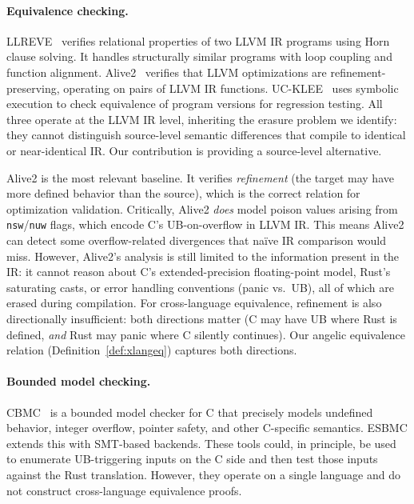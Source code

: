 \documentclass[11pt]{article}
\begin{document}
\paragraph{Equivalence checking.}
LLREVE~\cite{felsing2014} verifies relational properties of two LLVM IR programs using Horn clause solving. It handles structurally similar programs with loop coupling and function alignment. Alive2~\cite{lopes2021alive2} verifies that LLVM optimizations are refinement-preserving, operating on pairs of LLVM IR functions. UC-KLEE~\cite{ramos2015} uses symbolic execution to check equivalence of program versions for regression testing. All three operate at the LLVM IR level, inheriting the erasure problem we identify: they cannot distinguish source-level semantic differences that compile to identical or near-identical IR. Our contribution is providing a source-level alternative.

Alive2 is the most relevant baseline. It verifies \emph{refinement} (the target may have more defined behavior than the source), which is the correct relation for optimization validation. Critically, Alive2 \emph{does} model poison values arising from \texttt{nsw}/\texttt{nuw} flags, which encode C's UB-on-overflow in LLVM IR. This means Alive2 can detect some overflow-related divergences that na\"ive IR comparison would miss. However, Alive2's analysis is still limited to the information present in the IR: it cannot reason about C's extended-precision floating-point model, Rust's saturating casts, or error handling conventions (panic vs.\ UB), all of which are erased during compilation. For cross-language equivalence, refinement is also directionally insufficient: both directions matter (C may have UB where Rust is defined, \emph{and} Rust may panic where C silently continues). Our angelic equivalence relation (Definition~\ref{def:xlangeq}) captures both directions.

\paragraph{Bounded model checking.}
CBMC~\cite{clarke2004cbmc} is a bounded model checker for C that precisely models undefined behavior, integer overflow, pointer safety, and other C-specific semantics. ESBMC extends this with SMT-based backends. These tools could, in principle, be used to enumerate UB-triggering inputs on the C side and then test those inputs against the Rust translation. However, they operate on a single language and do not construct cross-language equivalence proofs.
\end{document}
